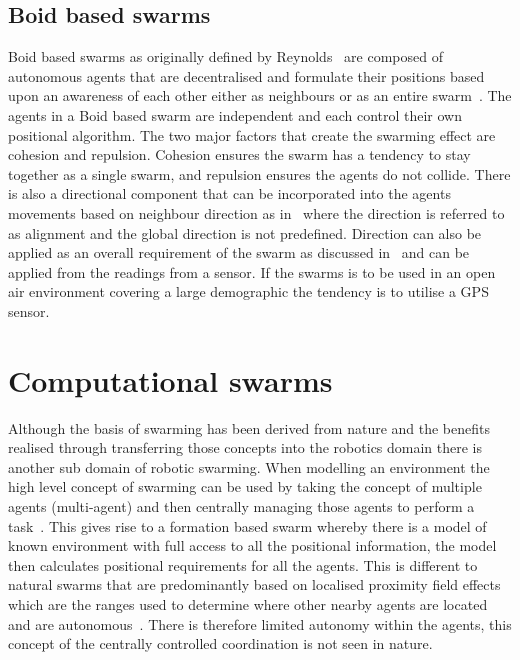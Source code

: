 \subsection{Boid based swarms}
Boid based swarms as originally defined by Reynolds~\cite{REY:87} are composed of autonomous agents that are decentralised and formulate their positions based upon an awareness of each other either as neighbours or as an entire swarm~\cite{JMM:08, CHRE:04, HSR:07}. The agents in a Boid based swarm are independent and each control their own positional algorithm. The two major factors that create the swarming effect are cohesion and repulsion. Cohesion ensures the swarm has a tendency to stay together as a single swarm, and repulsion ensures the agents do not collide. There is also a directional component that can be incorporated into the agents movements based on neighbour direction as in~\cite{REY:87, JMM:08} where the direction is referred to as alignment and the global direction is not predefined. Direction can also be applied as an overall requirement of the swarm as discussed in~\cite{HAY:08, IGMFM:08} and can be applied from the readings from a sensor. If the swarms is to be used in an open air environment covering a large demographic the tendency is to utilise a GPS sensor.

\section{Computational swarms}
Although the basis of swarming has been derived from nature and the benefits realised through transferring those concepts into the robotics domain there is another sub domain of robotic swarming. When modelling an environment the high level concept of swarming can be used by taking the concept of multiple agents (multi-agent) and then centrally managing those agents to perform a task~\cite{MGFND:05}. This gives rise to a formation based swarm whereby there is a model of known environment with full access to all the positional information, the model then calculates positional requirements for all the agents. This is different to natural swarms that are predominantly based on localised proximity field effects which are the ranges used to determine where other nearby agents are located and are autonomous~\cite{BAF:06}. There is therefore limited autonomy within the agents, this concept of the centrally controlled coordination is not seen in nature.

